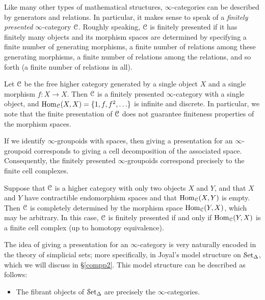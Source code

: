 \begin{1.2.14 Presentations of inf-cats}
Like many other types of mathematical structures, $\infty$-categories can be described by generators and relations. In particular, it makes sense to speak of a {\it
finitely presented} $\infty$-category $\operatorname{\mathcal{C}}$. Roughly speaking, $\operatorname{\mathcal{C}}$ is finitely presented
if it has finitely many objects and its morphism spaces are determined
by specifying a finite number of generating morphisms, a finite
number of relations among these generating morphisms, a finite
number of relations among the relations, and so forth (a finite
number of relations in all).

\begin{example}\label{infinitemorphisms}
Let $\operatorname{\mathcal{C}}$ be the free higher category generated by a single
object $X$ and a single morphism $f: X \rightarrow X$. Then
$\operatorname{\mathcal{C}}$ is a finitely presented $\infty$-category with a single
object, and $\operatorname{Hom}_{\operatorname{\mathcal{C}}}(X,X) = \{ 1, f, f^2, \ldots \}$ is
infinite and discrete. In particular, we note that the finite
presentation of $\operatorname{\mathcal{C}}$ does not guarantee finiteness properties
of the morphism spaces.
\end{example}

\begin{example}
If we identify $\infty$-groupoids with spaces, then giving a
presentation for an $\infty$-groupoid corresponds to giving a cell
decomposition of the associated space. Consequently, the finitely
presented $\infty$-groupoids correspond precisely to the finite
cell complexes.
\end{example}

\begin{example}
Suppose that $\operatorname{\mathcal{C}}$ is a higher category with only two objects
$X$ and $Y$, and that $X$ and $Y$ have contractible endomorphism
spaces and that $\operatorname{Hom}_{\operatorname{\mathcal{C}}}(X,Y)$ is empty. Then $\operatorname{\mathcal{C}}$ is
completely determined by the morphism space $\operatorname{Hom}_{\operatorname{\mathcal{C}}}(Y,X)$,
which may be arbitrary. In this case, $\operatorname{\mathcal{C}}$ is finitely
presented if and only if $\operatorname{Hom}_{\operatorname{\mathcal{C}}}(Y,X)$ is a finite cell
complex (up to homotopy equivalence).
\end{example}

The idea of giving a presentation for an $\infty$-category is very
naturally encoded in the theory of simplicial sets; more
specifically, in Joyal's model structure on $\operatorname{\mathcal{S}et_{\Delta}}$, which we will discuss in
\S \ref{compp2}. This model structure can be described as follows:

\begin{itemize}
\item The fibrant objects of $\operatorname{\mathcal{S}et_{\Delta}}$ are precisely the
$\infty$-categories.


\end{itemize}
\end{1.2.14 Presentations of inf-cats}
